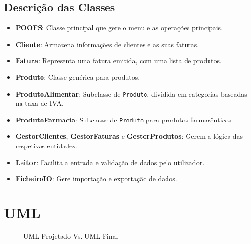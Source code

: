 \documentclass[a4paper, 11pt]{article}
\newcommand\ssection[1]{\section{#1} }
\newcommand\sssection[1]{ \subsection*{\color{MidnightBlue}#1}\vspace{-2ex} }
\begin{document}
\sssection{Descrição das Classes}
\begin{itemize}
    \setlength\itemsep{0em}
    \item \textbf{{POOFS}}: Classe principal que gere o menu e as operações principais.
    \item \textbf{{Cliente}}: Armazena informações de clientes e as suas faturas.
    \item \textbf{{Fatura}}: Representa uma fatura emitida, com uma lista de produtos.
    \item \textbf{{Produto}}: Classe genérica para produtos.
    \item \textbf{{ProdutoAlimentar}}: Subclasse de \texttt{Produto}, dividida em categorias baseadas na taxa de IVA.
    \item \textbf{{ProdutoFarmacia}}: Subclasse de \texttt{Produto} para produtos farmacêuticos.
    \item \textbf{GestorClientes}, \textbf{GestorFaturas} e \textbf{GestorProdutos}: Gerem a lógica das respetivas entidades.
    \item \textbf{{Leitor}}: Facilita a entrada e validação de dados pelo utilizador.
    \item \textbf{{FicheiroIO}}: Gere importação e exportação de dados.
\end{itemize}

\ssection{UML}

\begin{figure}[h!]
    \centering
    \qquad
    \caption{UML Projetado Vs. UML Final}%
\end{figure}
\end{document}
